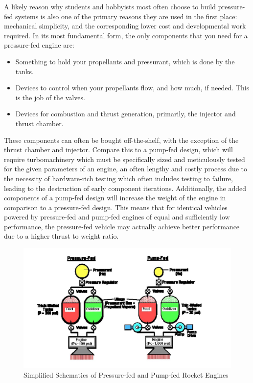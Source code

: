 \documentclass[12pt, letterpaper]{article}
\begin{document}
A likely reason why students and hobbyists most often choose to build pressure-fed systems is also one of the primary reasons they are used in the first place: mechanical simplicity, and the corresponding lower cost and developmental work required. In its most fundamental form, the only components that you need for a pressure-fed engine are:
\begin{itemize}
    \item Something to hold your propellants and pressurant, which is done by the tanks.
    \item Devices to control when your propellants flow, and how much, if needed. This is the job of the valves.
    \item Devices for combustion and thrust generation, primarily, the injector and thrust chamber.
\end{itemize}

These components can often be bought off-the-shelf, with the exception of the thrust chamber and injector. Compare this to a pump-fed design, which will require turbomachinery which must be specifically sized and meticulously tested for the given parameters of an engine, an often lengthy and costly process due to the necessity of hardware-rich testing which often includes testing to failure, leading to the destruction of early component iterations. Additionally, the added components of a pump-fed design will increase the weight of the engine in comparison to a pressure-fed design. This means that for identical vehicles powered by pressure-fed and pump-fed engines of equal and sufficiently low performance, the pressure-fed vehicle may actually achieve better performance due to a higher thrust to weight ratio.

\begin{figure}[t]
    \centering
    \includegraphics[width=15cm]{PumpVPressure.jpg}
    \caption{Simplified Schematics of Pressure-fed and Pump-fed Rocket Engines}
\end{figure}
\end{document}
